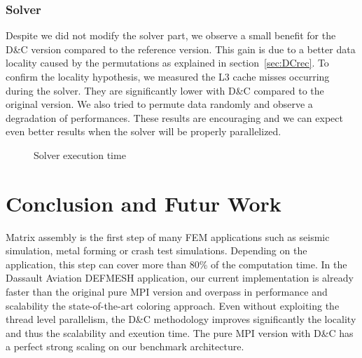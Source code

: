 \documentclass{IOS-Book-Article}
\begin{document}
\subsubsection{Solver}
Despite we did not modify the solver part, we observe a small benefit for the D\&C version compared to the reference version.
This gain is due to a better data locality caused by the permutations as explained in section~\ref{sec:DCrec}.
To confirm the locality hypothesis, we measured the L3 cache misses occurring during the solver. They are significantly lower with D\&C compared to the original version.
We also tried to permute data randomly and observe a degradation of performances.
These results are encouraging and we can expect even better results when the solver will be properly parallelized.
\begin{figure}[htp]
 \centering
 \caption{Solver execution time}
 \label{fig:solCurves}
\end{figure}

\section{Conclusion and Futur Work}
Matrix assembly is the first step of many FEM applications such as seismic simulation, metal forming or crash test simulations.
Depending on the application, this step can cover more than 80\% of the computation time.
In the Dassault Aviation DEFMESH application, our current implementation is already faster than the original pure MPI version and overpass in performance and scalability the state-of-the-art coloring approach.
Even without exploiting the thread level parallelism, the D\&C methodology improves significantly the locality and thus the scalability and exeution time.
The pure MPI version with D\&C has a perfect strong scaling on our benchmark architecture.
\end{document}
